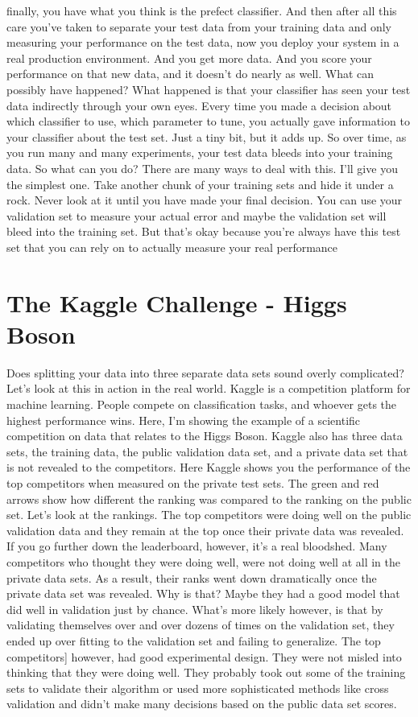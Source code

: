 \documentclass{article}
\begin{document}
finally, you have what you think
is the prefect classifier.
And then after all this care you've
taken to separate your test data from
your training data and only measuring
your performance on the test data,
now you deploy your system in
a real production environment.
And you get more data.
And you score your performance
on that new data, and
it doesn't do nearly as well.
What can possibly have happened?
What happened is that your
classifier has seen your test data
indirectly through your own eyes.
Every time you made a decision about
which classifier to use, which parameter
to tune, you actually gave information
to your classifier about the test set.
Just a tiny bit, but it adds up.
So over time, as you run many and
many experiments, your test data
bleeds into your training data.
So what can you do?
There are many ways to deal with this.
I'll give you the simplest one.
Take another chunk of your training
sets and hide it under a rock.
Never look at it until you
have made your final decision.
You can use your validation set
to measure your actual error and
maybe the validation set will
bleed into the training set.
But that's okay because you're
always have this test set
that you can rely on to actually
measure your real performance
\section{The Kaggle Challenge - Higgs Boson}
Does splitting your data into
three separate data sets
sound overly complicated?
Let's look at this in
action in the real world.
Kaggle is a competition platform for
machine learning.
People compete on classification tasks,
and
whoever gets the highest
performance wins.
Here, I'm showing the example of
a scientific competition on data that
relates to the Higgs Boson.
Kaggle also has three data sets,
the training data, the public validation
data set, and a private data set that
is not revealed to the competitors.
Here Kaggle shows you the performance
of the top competitors
when measured on the private test sets.
The green and red arrows show
how different the ranking was
compared to the ranking
on the public set.
Let's look at the rankings.
The top competitors were doing well
on the public validation data and
they remain at the top once
their private data was revealed.
If you go further down the leaderboard,
however, it's a real bloodshed.
Many competitors who thought
they were doing well,
were not doing well at all
in the private data sets.
As a result,
their ranks went down dramatically once
the private data set was revealed.
Why is that?
Maybe they had a good model that did
well in validation just by chance.
What's more likely however, is that
by validating themselves over and
over dozens of times on the validation
set, they ended up over fitting
to the validation set and
failing to generalize.
The top competitors] however,
had good experimental design.
They were not misled into thinking
that they were doing well.
They probably took out some of
the training sets to validate their
algorithm or used more sophisticated
methods like cross validation and
didn't make many decisions based
on the public data set scores.
\end{document}
